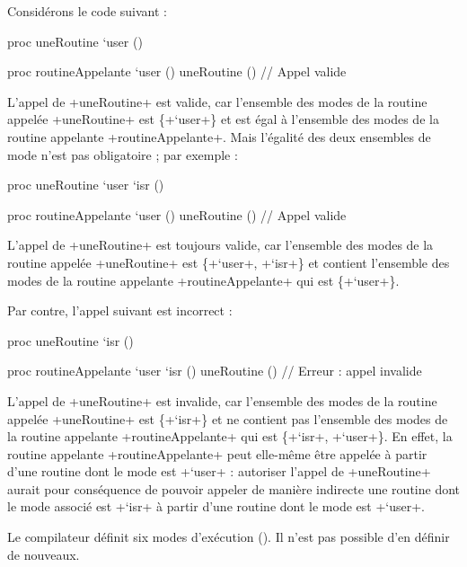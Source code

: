Considérons le code suivant :
\begin{PLM}
proc uneRoutine `user () {
}

proc routineAppelante `user () {
  uneRoutine () // Appel valide
}
\end{PLM}

L'appel de \plm+uneRoutine+ est valide, car l'ensemble des modes de la routine appelée \plm+uneRoutine+ est \{\plm+`user+\} et est égal à l'ensemble des modes de la routine appelante \plm+routineAppelante+. Mais l'égalité des deux ensembles de mode n'est pas obligatoire ; par exemple :

\begin{PLM}
proc uneRoutine `user `isr () {
}

proc routineAppelante `user () {
  uneRoutine () // Appel valide
}
\end{PLM}


L'appel de \plm+uneRoutine+ est toujours valide, car l'ensemble des modes de la routine appelée \plm+uneRoutine+ est \{\plm+`user+, \plm+`isr+\} et contient l'ensemble des modes de la routine appelante \plm+routineAppelante+ qui est \{\plm+`user+\}. 

Par contre, l'appel suivant est incorrect :

\begin{PLM}
proc uneRoutine `isr () {
}

proc routineAppelante `user `isr () {
  uneRoutine () // Erreur : appel invalide
}
\end{PLM}

L'appel de \plm+uneRoutine+ est invalide, car l'ensemble des modes de la routine appelée \plm+uneRoutine+ est \{\plm+`isr+\} et ne contient pas l'ensemble des modes de la routine appelante \plm+routineAppelante+ qui est \{\plm+`isr+, \plm+`user+\}. En effet, la routine appelante \plm+routineAppelante+ peut elle-même être appelée à partir d'une routine dont le mode est \plm+`user+ : autoriser l'appel de \plm+uneRoutine+ aurait pour conséquence de pouvoir appeler de manière indirecte une routine dont le mode associé est \plm+`isr+ à partir d'une routine dont le mode est \plm+`user+.



Le compilateur définit six modes d'exécution (). Il n'est pas possible d'en définir de nouveaux.





